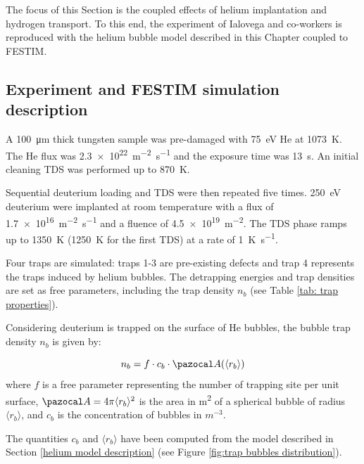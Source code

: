 The focus of this Section is the coupled effects of helium implantation and hydrogen transport.
To this end, the experiment of Ialovega and co-workers  is reproduced with the helium bubble model described in this Chapter coupled to FESTIM.

\subsection{Experiment and FESTIM simulation description}

A \SI{100}{\micro\metre} thick tungsten sample was pre-damaged with \SI{75}{eV} He at \SI{1073}{K}.
The He flux was \SI{2.3e22}{m^{-2}.s^{-1}} and the exposure time was \SI{13}{s}.
An initial cleaning TDS was performed up to \SI{870}{K}.

Sequential deuterium loading and TDS were then repeated five times.
\SI{250}{eV} deuterium were implanted at room temperature with a flux of \SI{1.7e16}{m^{-2}.s^{-1}} and a fluence of \SI{4.5e19}{m^{-2}}.
The TDS phase ramps up to \SI{1350}{K} (\SI{1250}{K} for the first TDS) at a rate of \SI{1}{K.s^{-1}}.

Four traps are simulated: traps 1-3 are pre-existing defects and trap 4 represents the traps induced by helium bubbles.
The detrapping energies and trap densities are set as free parameters, including the trap density $n_b$ (see Table \ref{tab: trap properties}).

Considering deuterium is trapped on the surface of He bubbles, the bubble trap density $n_b$ is given by:

\begin{equation}
    n_b = f \cdot c_b \cdot \Ab(\langle r_b \rangle)
\end{equation}
where $f$ is a free parameter representing the number of trapping site per unit surface, $\Ab = 4\pi \langle r_b \rangle^2$ is the area in \si{m^2} of a spherical bubble of radius $\langle r_b \rangle$, and $c_b$ is the concentration of bubbles in $\si{m^{-3}}$.

The quantities $c_b$ and $\langle r_b \rangle$ have been computed from the model described in Section \ref{helium model description} (see Figure \ref{fig:trap bubbles distribution}).

